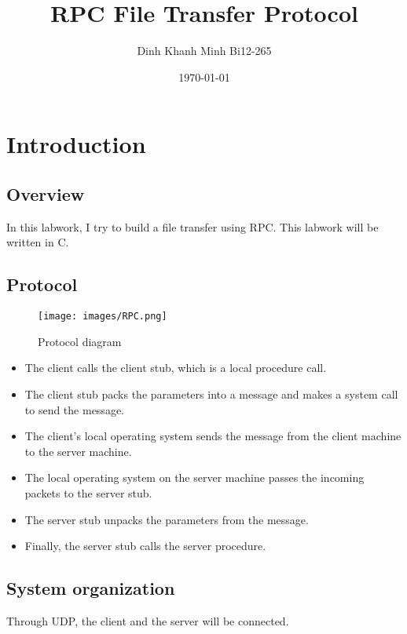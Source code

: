 \documentclass[]{article}
\begin{document}
\title{RPC File Transfer Protocol}
\author{Dinh Khanh Minh Bi12-265}
\date{\today}

\maketitle

\tableofcontents
\newpage

\section{Introduction}
\subsection{Overview}
\noindent%
In this labwork, I try to build a file transfer using RPC. This labwork will be written in C.

\subsection{Protocol}

\begin{figure}[h]
    \centering
    \texttt{[image: images/RPC.png]}
    \caption{Protocol diagram}
    \label{fig:protocol}
\end{figure}

\begin{itemize}
    \item The client calls the client stub, which is a local procedure call.
    \item The client stub packs the parameters into a message and makes a system call to send the message.
    \item The client's local operating system sends the message from the client machine to the server machine.
    \item The local operating system on the server machine passes the incoming packets to the server stub.
    \item The server stub unpacks the parameters from the message. 
    \item Finally, the server stub calls the server procedure.
\end{itemize}

\subsection{System organization}
\noindent%
Through UDP, the client and the server will be connected.
\end{document}
